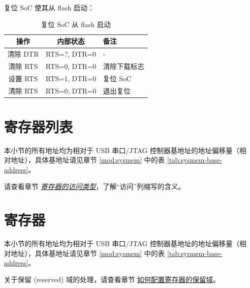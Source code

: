 \documentclass[main\_\_CN.tex]{subfiles}
\begin{document}
复位 SoC 使其从 flash 启动：

\begin{table}[H]
\centering
\caption{复位 SoC 从 flash 启动}
\label{tab:usbserialjtag-reset-soc-into-booting}

\begin{tabular} {|c|c|l|}\hline
\rowcolor{lightgray}
\textbf{操作} & \textbf{内部状态} & \textbf{备注} \\\hline

清除 DTR & RTS=?, DTR=0 & - \\\hline
清除 RTS & RTS=0, DTR=0 &  清除下载标志 \\\hline
设置 RTS & RTS=1, DTR=0 &  复位 SoC \\\hline
清除 RTS & RTS=0, DTR=0 & 退出复位 \\\hline
\end{tabular}
\end{table}





\newpage
\hypertarget{usbserialjtag-reg-summ}{}
\section{寄存器列表}
\label{sec:usbserialjtag-reg-summ}

本小节的所有地址均为相对于 USB 串口/JTAG 控制器基地址的地址偏移量（相对地址），具体基地址请见章节 \ref{mod:sysmem} \textit{} 中的表 \ref{tab:sysmem-base-address}。

请查看章节 \hyperref[glossary-access-types]{\textit{寄存器的访问类型}}，了解“访问”列缩写的含义。






\newpage
\section{寄存器}

本小节的所有地址均为相对于 USB 串口/JTAG 控制器基地址的地址偏移量（相对地址），具体基地址请见章节 \ref{mod:sysmem} \textit{} 中的表 \ref{tab:sysmem-base-address}。

关于保留 (reserved) 域的处理，请查看章节 \hyperref[programming-reserved-field]{如何配置寄存器的保留域}。


\end{document}
